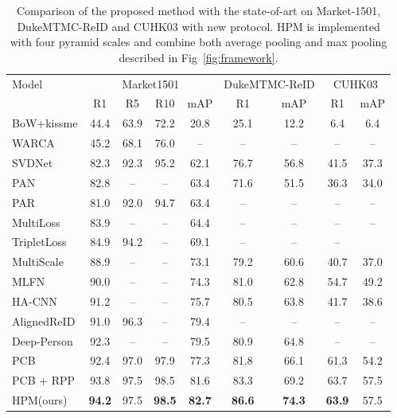 \documentclass[letterpaper]{article} \usepackage{aaai19}  \usepackage{times}  \usepackage{helvet}  \usepackage{courier}  \usepackage{url}  \usepackage{graphicx}  \frenchspacing  \setlength{\pdfpagewidth}{8.5in}  \setlength{\pdfpageheight}{11in}  \usepackage{multirow}
\begin{document}
\begin{table*}[t]\setlength{\tabcolsep}{8pt}
\centering
\begin{tabular}{l|c|c|c|c|c|c|c|c}
\hline
\multirow{2}{*}{Model} & \multicolumn{4}{c}{Market1501}  & \multicolumn{2}{|c}{DukeMTMC-ReID} & \multicolumn{2}{|c}{CUHK03}  \\ \cline{2-9}
& R1 & R5 & R10 & mAP & R1 & mAP & R1 & mAP \\ \hline
BoW+kissme \cite{zheng2015scalable} & 44.4 & 63.9 & 72.2 & 20.8 & 25.1 & 12.2 & 6.4 & 6.4\\
WARCA \cite{jose2016scalable} &  45.2 & 68.1 & 76.0 & -- & -- & -- & -- & --\\
SVDNet \cite{sun2017svdnet} &  82.3 & 92.3 & 95.2 & 62.1 & 76.7 & 56.8 & 41.5 & 37.3\\ 
PAN \cite{zheng2017pedestrian} &  82.8 & -- & -- & 63.4 & 71.6 & 51.5 & 36.3 & 34.0\\
PAR \cite{Zhao2017DeeplyLearnedPR} &  81.0 & 92.0 & 94.7 & 63.4 & -- & -- & -- & --\\
MultiLoss \cite{Li2017PersonRB} &  83.9 & -- & -- & 64.4 & -- & -- & -- & --\\
TripletLoss \cite{hermans2017defense} &  84.9 & 94.2 & -- &69.1 & -- & -- & --\\
MultiScale \cite{Chen2017PersonRB} & 88.9 & -- & -- & 73.1 & 79.2 & 60.6 & 40.7 & 37.0 \\
MLFN \cite{chang2018multi} & 90.0 & -- & -- &  74.3 & 81.0 &  62.8 & 54.7 & 49.2\\ 
HA-CNN \cite{li2018harmonious} &  91.2 & -- & -- & 75.7 & 80.5 & 63.8 & 41.7 & 38.6\\
AlignedReID \cite{zhang2017alignedreid} & 91.0& 96.3& -- & 79.4 & -- & -- & -- & -- \\
Deep-Person \cite{bai2017deep} & 92.3 & -- & -- & 79.5 & 80.9 & 64.8 & -- & --\\
PCB \cite{sun2017beyond} & 92.4 & 97.0 & 97.9 & 77.3 & 81.8 & 66.1 & 61.3 & 54.2\\
PCB + RPP\cite{sun2017beyond} &  93.8 & 97.5 & 98.5 & 81.6 & 83.3 & 69.2 & 63.7 & 57.5 \\ \hline
HPM(ours) & {\bf 94.2} & 97.5 & {\bf 98.5} &  {\bf 82.7} & {\bf 86.6} & {\bf 74.3} & {\bf 63.9} & 57.5 \\ \hline
\end{tabular}
\caption{Comparison of the proposed method with the state-of-art on Market-1501, DukeMTMC-ReID and CUHK03 with new protocol. HPM is implemented with four pyramid scales and combine both average pooling and max pooling described in Fig~\ref{fig:framework}.}
\vspace{-2mm}
\label{exp:soa}
\end{table*}
\end{document}
